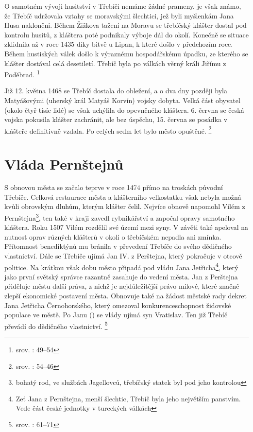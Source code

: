 \documentclass[a4paper,oneside,12p]{report}
\begin{document}
O samotném vývoji husitství v Třebíči nemáme žádné prameny, je však známo, že Třebíč udržovala vztahy se moravskými šlechtici, jež byli myšlenkám Jana Husa nakloněni.
Během Žižkova tažení na Moravu se třebíčský klášter dostal pod kontrolu husitů, z kláštera poté podnikaly výboje dál do okolí.
Konečně se situace zklidnila až v roce 1435 díky bitvě u Lipan, k které došlo v předchozím roce.
Během hustiských válek došlo k výraznému hospodářskému úpadku, ze kterého se klášter dostával celá desetiletí.
Třebíč byla po válkách věrný králi Jiřímu z Poděbrad. \footnote{srov. : 49--54}

Již 12. května 1468 se Třebíč dostala do obležení, a o dva dny později byla Matyášovými (uherský král Matyáš Korvín) vojsky dobyta.
Velká část obyvatel (okolo čtyř tisíc lidé) se však uchýlila do opevněného kláštera.
6. června se česká vojska pokusila klášter zachránit, ale bez úspěchu, 15. června se posádka v klášteře definitivně vzdala.
Po celých sedm let bylo město opuštěné. \footnote{srov. : 54--46}

\section{Vláda Pernštejnů}

S obnovou města se začalo teprve v roce 1474 přímo na troskách původní Třebíče.
Celková restaurace města a klášterního velkostatku však nebyla možná kvůli obrovským dluhům, kterým klášter čelil.
Nejvíce obnově napomohl Vilém z Pernštejna\footnote{bohatý rod, ve službách Jagellovců, třebíčský statek byl pod jeho kontrolou}, ten také v kraji zavedl rybnikářství a započal opravy samotného kláštera.
Roku 1507 Vilém rozdělil své území mezi syny. V závěti také apeloval na nutnost oprav různých klášterů v okolí o třebíčském nepadla ani zmínka.
Přítomnost benediktýnů mu bránila v převedení Třebíče do svého dědičného vlastnictví.
Dále se Třebíče ujímá Jan IV. z Perštejna, který pokračuje v otcově politice.
Na krátkou však dobu město připadá pod vládu Jana Jetřicha\footnote{Zeť Jana z Pernštejna, menší šlechtic, Třebíč byla jeho největším panstvím. Vede část české jednotky v tureckých válkách}, který jako první světský správce razantně zasahuje do vedení města.
Jan z Perštejna přiděluje městu další práva, z nichž je nejdůležitější právo mílové, které značně zlepší ekonomické postavení města.
Obnovuje také na žádost městské rady dekret Jana Jetřicha Černohorského, který omezoval konkurenceschopnost židovské populace ve městě.
Po Janu () se vlády ujímá syn Vratislav.
Ten již Třebíč převádí do dědičného vlastnictví. \footnote{srov. : 61--71}
\end{document}
